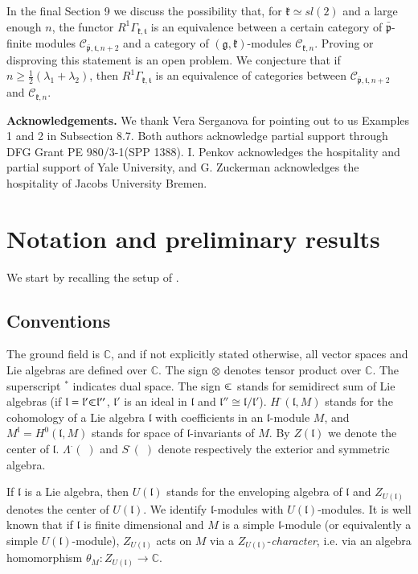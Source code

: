 \documentclass[11pt]{amsart}
\renewcommand{\tt}{\mathfrak{t}}
\newcommand{\kk}{\mathfrak{k}}
\newcommand{\pp}{\mathfrak{p}}
\renewcommand{\gg}{\mathfrak{g}}
\renewcommand{\ll}{\mathfrak{l}}
\newcommand{\field}[1]{\mathbb{#1}}
\def\clplus{\hbox{$\subset${\raise0.3ex\hbox{\kern -0.55em ${\scriptscriptstyle +}$}}\ }}
\begin{document}
In the final Section 9 we  discuss the possibility that, for $\kk\simeq sl(2)$ and a large enough $n$, the functor $R^1\Gamma_{\kk,\tt}$ is an equivalence between a certain category of $\bar{\pp}$-finite modules $\mathcal{C}_{\bar{\pp},\tt,n+2}$ and a category of $(\gg,\kk)$-modules $\mathcal{C}_{\kk,n}$. Proving or disproving this statement is an open problem. We conjecture that if $n\geq\frac{1}{2}(\lambda_1+\lambda_2)$, then $R^1\Gamma_{\kk,\tt}$ is an equivalence of categories between $\mathcal{C}_{\bar{\pp},\tt,n+2}$ and $\mathcal{C}_{\kk,n}$.

\textbf{Acknowledgements.} We thank Vera Serganova for pointing out to us Examples 1 and 2 in Subsection 8.7. Both authors acknowledge partial support through DFG Grant PE 980/3-1(SPP 1388). I. Penkov acknowledges the hospitality and partial support of Yale University, and G. Zuckerman acknowledges the hospitality of Jacobs University Bremen.

\section{Notation and preliminary results}
We start by recalling the setup of \cite{PZ2}.
\subsection{Conventions}

The ground field is $\field{C}$, and if not explicitly stated otherwise, all vector spaces and Lie algebras are defined over $\field{C}$. The sign $\otimes$ denotes tensor product over $\field{C}$. The superscript $^*$ indicates dual space. The sign $\clplus$ stands for semidirect sum of Lie algebras (if $\ll=\ll '\clplus\ll ''$, $\ll '$ is an ideal in $\ll$ and $\ll ''\cong\ll /\ll '$). $H^\cdot(\ll,M)$ stands for the cohomology of a Lie algebra $\ll$ with coefficients in an $\ll$-module $M$, and $M^\ll=H^0(\ll,M)$ stands for space of $\ll$-invariants of $M$. By $Z(\ll)$ we denote the center of $\ll$. $\Lambda^\cdot( \;)$ and $S^\cdot( \;)$ denote respectively the exterior and symmetric algebra.

If $\ll$ is a Lie algebra, then $U(\ll)$ stands for the enveloping algebra of $\ll$ and $Z_{U(\ll)}$ denotes the center of $U(\ll)$. We identify $\ll$-modules with $U(\ll)$-modules. It is well known that if $\ll$ is finite dimensional and $M$ is a simple $\ll$-module (or equivalently a simple $U(\ll)$-module), $Z_{U(\ll)}$ acts on $M$ via a $Z_{U(\ll)}$-\textit{character}, i.e. via an algebra homomorphism $\theta_{M}: Z_{U(\ll)}\rightarrow\field{C}$.
\end{document}
